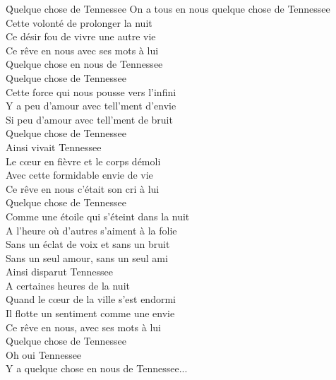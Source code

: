 \documentclass{novel}
\begin{document}
\newpage
\normalsize

\h*{Quelque chose de Tennessee}
On a tous en nous quelque chose de Tennessee \\
Cette volonté de prolonger la nuit \\
Ce désir fou de vivre une autre vie \\
Ce rêve en nous avec ses mots à lui \\
Quelque chose en nous de Tennessee \\

Quelque chose de Tennessee \\
Cette force qui nous pousse vers l'infini \\
Y a peu d'amour avec tell'ment d'envie \\
Si peu d'amour avec tell'ment de bruit \\
Quelque chose de Tennessee \\

Ainsi vivait Tennessee \\
Le cœur en fièvre et le corps démoli \\
Avec cette formidable envie de vie \\
Ce rêve en nous c'était son cri à lui \\
Quelque chose de Tennessee \\

Comme une étoile qui s'éteint dans la nuit \\
A l'heure où d'autres s'aiment à la folie \\
Sans un éclat de voix et sans un bruit \\
Sans un seul amour, sans un seul ami \\
Ainsi disparut Tennessee \\

A certaines heures de la nuit \\
Quand le cœur de la ville s'est endormi \\
Il flotte un sentiment comme une envie \\
Ce rêve en nous, avec ses mots à lui \\
Quelque chose de Tennessee \\
Oh oui Tennessee \\
Y a quelque chose en nous de Tennessee... \\

\newpage
\large
\end{document}
